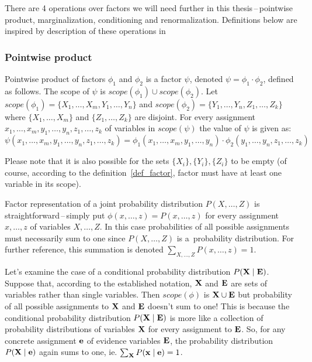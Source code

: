\documentclass[english,cover]{fitthesis} %
\newcommand{\vars}[1]{{\bold{#1}}}         %
\begin{document}
There are 4 operations over factors we will need further in this thesis\,--\,pointwise product, marginalization, conditioning and renormalization. Definitions below are inspired by description of these operations in~\cite{russell_norvig_ed2, pgm}

\subsubsection{Pointwise product}
Pointwise product of factors $\phi_1$ and $\phi_2$ is a factor $\psi$, denoted $\psi = \phi_1 \cdot \phi_2$, defined as follows. The scope of $\psi$ is $scope(\phi_1) \cup scope(\phi_2)$. Let $scope(\phi_1) = \lbrace X_1, \dots, X_m, Y_1, \dots, Y_n \rbrace$ and $scope(\phi_2) = \lbrace Y_1, \dots, Y_n, Z_1, \dots, Z_k \rbrace$ where $\lbrace X_1, \dots, X_m \rbrace$ and $\lbrace Z_1, \dots, Z_k \rbrace$ are disjoint. For every assignment $x_1, \dots, x_m, y_1, \dots, y_n, z_1, \dots, z_k$ of variables in $scope(\psi)$ the value of $\psi$ is given as:
$$\psi(x_1, \dots, x_m, y_1, \dots, y_n, z_1, \dots, z_k)
= \phi_1(x_1, \dots, x_m, y_1, \dots, y_n) \cdot \phi_2(y_1, \dots, y_n, z_1, \dots, z_k)
$$

Please note that it is also possible for the sets $\lbrace X_i \rbrace, \lbrace Y_i \rbrace,\lbrace Z_i \rbrace$ to be empty (of course, according to the definition~\ref{def_factor}, factor must have at least one variable in its scope).

Factor representation of a joint probability distribution $P(X,\dots,Z)$ is straightforward\,--\,simply put $\phi(x,\dots,z) = P(x,\dots,z)$ for every assignment $x,\dots,z$ of variables $X,\dots,Z$. In this case probabilities of all possible assignments must necessarily sum to one since $P(X,\dots,Z)$ is a~probability distribution. For further reference, this summation is denoted $\sum_{X,\dots,Z} P(x,\dots,z) = 1$.

Let's examine the case of a conditional probability distribution $P(\vars{X}\mid\vars{E})$. Suppose that, according to the established notation, $\vars{X}$ and $\vars{E}$ are sets of variables rather than single variables. Then $scope(\phi)$ is $\vars{X} \cup \vars{E}$ but probability of all possible assignments to $\vars{X}$ and $\vars{E}$ doesn't sum to one! This is because the conditional probability distribution $P(\vars{X}\mid\vars{E})$ is more like a collection of probability distributions of variables $\vars{X}$ for every assignment to $\vars{E}$. So, for any concrete assignment $\vars{e}$ of evidence variables $\vars{E}$, the probability distribution $P(\vars{X}\mid\vars{e})$ again sums to one, ie. $\sum_\vars{X} P(\vars{x}\mid\vars{e}) = 1$.
\end{document}
